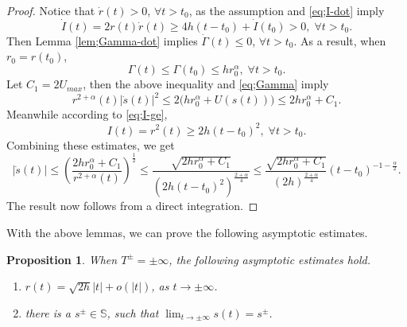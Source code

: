\documentclass[11pt]{amsart}
\newcommand{\bs}{\mathbb S}
\newcommand{\al}{\alpha}
\newcommand{\ey}{\frac{1}{2}}
\theoremstyle{plain}
\newtheorem{prop}{Proposition}[section]
\theoremstyle{definition}
\theoremstyle{remark}
\begin{document}
\begin{proof}
Notice that $\dot{r}(t) >0$, $\forall t >t_0$, as the assumption and \eqref{eq;I-dot} imply
$$ \dot{I}(t) = 2r(t) \dot{r}(t) \ge 4h(t-t_0) + \dot{I}(t_0) >0, \; \forall t >t_0. $$
Then Lemma \ref{lem;Gamma-dot} implies $\dot{\Gamma}(t) \le 0$, $\forall t >t_0$. As a result, when $r_0 = r(t_0)$,
$$ \Gamma(t) \le \Gamma(t_0) \le h r^{\al}_0, \; \forall t > t_0. $$
Let $C_1 = 2U_{max}$, then the above inequality and \eqref{eq;Gamma} imply
$$ r^{2 +\al}(t) |\dot{s}(t)|^2 \le 2\big(h r_0^{\al} + U(s(t)) \big) \le 2h r_0^{\al} + C_1. $$
Meanwhile according to \eqref{eq;I-ge}, 
$$ I(t) =r^2(t) \ge 2h(t-t_0)^2, \; \forall t >t_0. $$
Combining these estimates, we get 
$$ |\dot{s}(t)| \le \left( \frac{2h r_0^{\al}+C_1}{r^{2 +\al}(t)} \right)^{\ey} \le \frac{\sqrt{2h r_0^{\al}+C_1}}{(2h(t-t_0)^2)^{\frac{2+\al}{4}}} \le  \frac{\sqrt{2h r_0^{\al}+C_1}}{(2h )^{\frac{2+\al}{4}}} (t-t_0)^{-1 -\frac{\al}{2}}. $$
The result now follows from a direct integration. 
\end{proof}

With the above lemmas, we can prove the following asymptotic estimates. 
\begin{prop} \label{prop;r-s-lim} 
When $T^{\pm} = \pm \infty$, the following asymptotic estimates hold. 
\begin{enumerate}
\item[(a).] $r(t) = \sqrt{2h} |t| + o(|t|)$, as $t \to \pm \infty$.
\item[(b).] there is a $s^{\pm} \in \bs$, such that $\lim_{t \to \pm \infty} s(t) = s^{\pm}$. 
\end{enumerate}
\end{prop}
\end{document}

